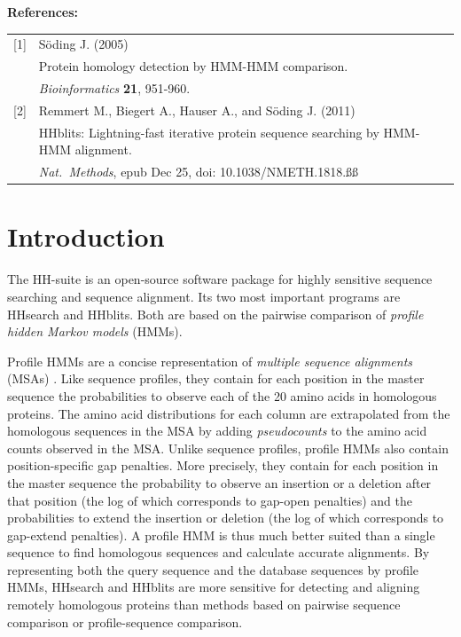 \documentclass[11pt,a4paper]{article}
\begin{document}
{\bf References:}


\begin{tabular}[t]{ll}
[1] & S\"oding J. (2005)\\ 
    & Protein homology detection by HMM-HMM comparison.\\
    & {\it Bioinformatics} {\bf 21}, 951-960.\\[2mm]

[2] & Remmert M., Biegert A., Hauser A., and S\"oding J. (2011) \\
    & HHblits: Lightning-fast iterative protein sequence searching by HMM-HMM alignment. \\
    & {\it Nat.\  Methods}, epub Dec 25, doi: 10.1038/NMETH.1818.ßß
\end{tabular}



\newpage

\setlength{\parskip}{0mm}
\tableofcontents
\setlength{\parskip}{2mm}

\newpage

\section{Introduction}
The HH-suite is an open-source software package for highly sensitive sequence searching and sequence alignment. Its two most important programs are HHsearch and HHblits. Both are based on the pairwise comparison of \textit{profile hidden Markov models} (HMMs). 

Profile HMMs are a concise representation of \textit{multiple sequence alignments} (MSAs) \cite{Durbin:2008,Krogh:1994}. Like sequence profiles, they contain for each position in the master sequence the probabilities to observe each of the 20 amino acids in homologous proteins. The amino acid distributions for each column are extrapolated from the homologous sequences in the MSA by adding \textit{pseudocounts} to the amino acid counts observed in the MSA. Unlike sequence profiles, profile HMMs also contain position-specific gap penalties. More precisely, they contain for each position in the master sequence the probability to observe an insertion or a deletion after that position (the log of which corresponds to gap-open penalties) and the probabilities to extend the insertion or deletion (the log of which corresponds to gap-extend penalties). A profile HMM is thus much better suited than a single sequence to find homologous sequences and calculate accurate alignments. By representing both the query sequence and the database sequences by profile HMMs, HHsearch and HHblits are more sensitive for detecting and aligning remotely homologous proteins than methods based on pairwise sequence comparison or profile-sequence comparison.
\end{document}
